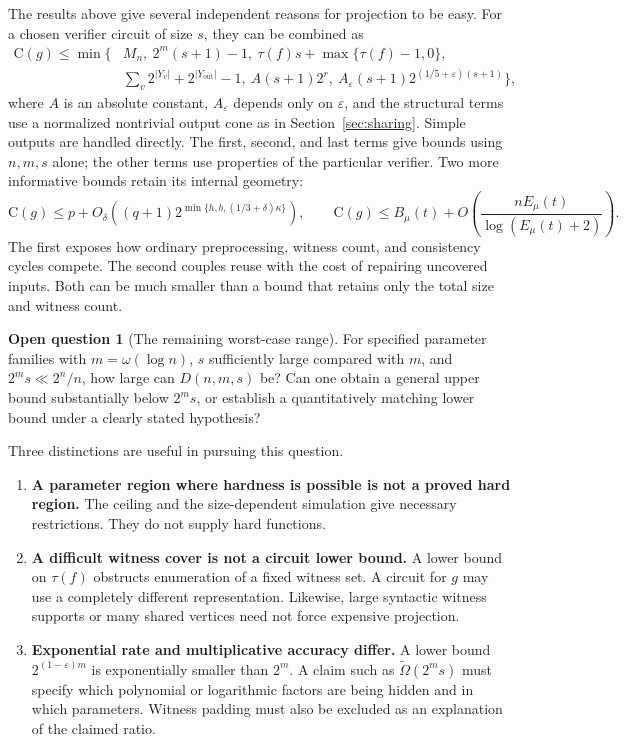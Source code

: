 \documentclass[11pt]{article}
\theoremstyle{definition}
\newtheorem{question}[theorem]{Open question}
\theoremstyle{remark}
\newcommand{\C}{\mathrm{C}}
\begin{document}
The results above give several independent reasons for projection to
be easy. For a chosen verifier circuit of size $s$, they can be
combined as
\begin{equation}\label{eq:combined}
\begin{split}
 \C(g)\le\min\bigl\{&M_n,\ 2^m(s+1)-1,\
       \tau(f)s+\max\{\tau(f)-1,0\},\\
       &\sum_v2^{|Y_v|}+2^{|Y_{\mathrm{out}}|}-1,\
       A(s+1)2^r,\ A_\varepsilon(s+1)2^{(1/5+\varepsilon)(s+1)}\bigr\},
\end{split}
\end{equation}
where $A$ is an absolute constant, $A_\varepsilon$ depends only on
$\varepsilon$, and the structural terms use a
normalized nontrivial output cone as in Section~\ref{sec:sharing}.
Simple outputs are handled directly. The first, second, and last
terms give bounds using $n,m,s$ alone; the other terms use properties
of the particular verifier.
Two more informative bounds retain its internal geometry:
\[
 \C(g)\le p+O_\delta\!\left((q+1)
      2^{\min\{h,b,(1/3+\delta)\kappa\}}\right),
 \qquad
 \C(g)\le B_\mu(t)+O\!\left(
       \frac{nE_\mu(t)}{\log(E_\mu(t)+2)}\right).
\]
The first exposes how ordinary preprocessing, witness count, and
consistency cycles compete. The second couples reuse with the cost
of repairing uncovered inputs. Both can be much smaller than a bound
that retains only the total size and witness count.

\begin{question}[The remaining worst-case range]
For specified parameter families with $m=\omega(\log n)$,
$s$ sufficiently large compared with $m$, and
$2^m s\ll2^n/n$, how large can $D(n,m,s)$ be?
Can one obtain a general upper bound substantially below $2^m s$,
or establish a quantitatively matching lower bound under a clearly
stated hypothesis?
\end{question}

Three distinctions are useful in pursuing this question.
\begin{enumerate}
 \item \textbf{A parameter region where hardness is possible is not
 a proved hard region.} The ceiling and the size-dependent simulation
 give necessary restrictions. They do not supply hard functions.
 \item \textbf{A difficult witness cover is not a circuit lower bound.}
 A lower bound on $\tau(f)$ obstructs enumeration of a fixed witness
 set. A circuit for $g$ may use a completely different representation.
 Likewise, large syntactic witness supports or many shared vertices
 need not force expensive projection.
 \item \textbf{Exponential rate and multiplicative accuracy differ.}
 A lower bound $2^{(1-\varepsilon)m}$ is exponentially smaller than
 $2^m$. A claim such as $\widetilde\Omega(2^m s)$ must specify which
 polynomial or logarithmic factors are being hidden and in which
 parameters. Witness padding must also be excluded as an explanation
 of the claimed ratio.
\end{enumerate}
\end{document}
